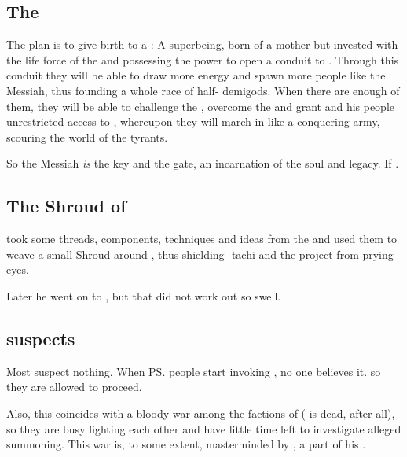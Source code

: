 \subsection{The \banemessiah}
The plan is to give birth to a \quo{\banemessiah}: A superbeing, born of a \nephilic{} mother but invested with the life force of the \banes{} and possessing the power to open a conduit to \Erebos{}. Through this conduit they will be able to draw more energy and spawn more people like the Messiah, thus founding a whole race of half-\bane{} demigods. 
When there are enough of them, they will be able to challenge the \dragons, overcome the  and grant \Daggerrain{} and his people unrestricted access to \Miith{}, whereupon they will march in like a conquering army, scouring the world of the \draconian{} tyrants. 

So the Messiah \emph{is} the key and the gate, an incarnation of the \bane{} soul and legacy. If .









\subsection{The Shroud of \Girigor}
\Daggerrain{} took some threads, components, techniques and ideas from the  and used them to weave a small Shroud around \Girigor, thus shielding \Semiza-tachi and the \resphan{} project from prying \draconian{} eyes. 

Later he went on to , but that did not work out so swell.









\subsection{\Vexstrasshin{} suspects}
Most \dragons{} suspect nothing. 
When \ps{\Semiza}{} people start invoking \banes{}, no one believes it. so they are allowed to proceed. 

Also, this coincides with a bloody war among the factions of \dragons{} (\Tiamat{} is dead, after all), so they are busy fighting each other and have little time left to investigate alleged \bane{} summoning. 
This war is, to some extent, masterminded by \Daggerrain, a part of his . 

